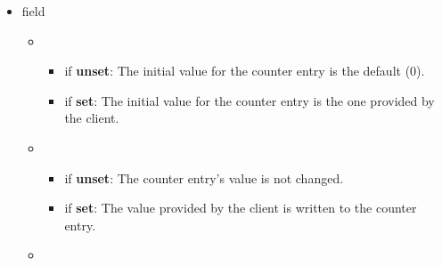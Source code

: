 \documentclass[11pt]{article}
\begin{document}
{\begin{itemize}
\item{}
 field%

\begin{itemize}[noitemsep,topsep=\mdcompacttopsep]%

\item{}

\begin{itemize}[noitemsep,topsep=\mdcompacttopsep]%

\item{}if \textbf{unset}: The initial value for the counter entry is the default
(0).%

\item{}if \textbf{set}: The initial value for the counter entry is the one
provided by the client.%
\end{itemize}%

\item{}

\begin{itemize}[noitemsep,topsep=\mdcompacttopsep]%

\item{}if \textbf{unset}: The counter entry's value is not changed.%

\item{}if \textbf{set}: The value provided by the client is written to the counter
entry.%
\end{itemize}%

\item{}

\begin{itemize}[noitemsep,topsep=\mdcompacttopsep]%


\end{itemize}
\end{itemize}
\end{itemize}}
\end{document}
